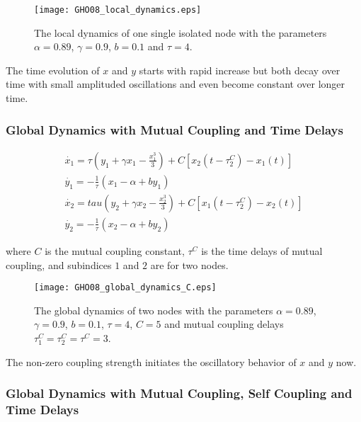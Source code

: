 \documentclass[12pt]{article}
\begin{document}
\begin{figure}[h!]
	\centering
	\texttt{[image: GHO08\_local\_dynamics.eps]}
		\caption{The local dynamics of one single isolated node with the parameters $\alpha = 0.89$, $\gamma=0.9$, $b=0.1$ and $\tau = 4$.}
\end{figure}

The time evolution of $x$ and $y$ starts with rapid increase but both decay over time with small amplituded oscillations and even become constant over longer time. 

\subsubsection{Global Dynamics with Mutual Coupling and Time Delays}

\begin{subequations}
 \begin{align}\dot{x_1} = \tau (y_1 + \gamma x_1 - \frac{x_1^3}{3}) + C [x_2(t-\tau_2^C)-x_1(t)] \label{eqn: frobenius 19}\\  \dot{y_1} = -\frac{1}{\tau} (x_1 - \alpha + b y_1) \label{eqn: frobenius 20} \\ \dot{x_2}=tau (y_2 + \gamma x_2 - \frac{x_2^3}{3}) + C [x_1(t-\tau_2^C)-x_2(t)] \label{eqn: frobenius 21} \\  \dot{y_2} = -\frac{1}{\tau} (x_2 - \alpha + by_2) \label{eqn: frobenius 22}\end{align} 
\end{subequations}

where $C$ is the mutual coupling constant, $\tau^C$ is the time delays of mutual coupling, and subindices $1$ and $2$ are for two nodes. 

\newpage

\begin{figure}[h!]
	\centering
	\texttt{[image: GHO08\_global\_dynamics\_C.eps]}
		\caption{The global dynamics of two nodes with the parameters $\alpha = 0.89$, $\gamma=0.9$, $b=0.1$, $\tau = 4$, $C=5$ and mutual coupling delays $\tau_1^C=\tau_2^C=\tau^C=3$.}
\end{figure}

The non-zero coupling strength initiates the oscillatory behavior of $x$ and $y$ now. 

\subsubsection{Global Dynamics with Mutual Coupling, Self Coupling and Time Delays}
\end{document}
